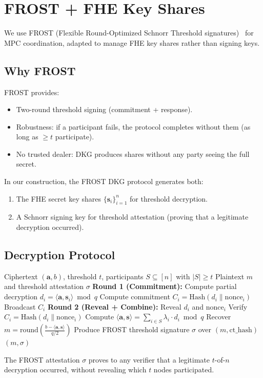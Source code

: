 \section{FROST + FHE Key Shares}


We use FROST (Flexible Round-Optimized Schnorr Threshold signatures)~\cite{frost2020} for MPC coordination, adapted to manage FHE key shares rather than signing keys.

\subsection{Why FROST}

FROST provides:
\begin{itemize}[leftmargin=2em]
\item Two-round threshold signing (commitment + response).
\item Robustness: if a participant fails, the protocol completes without them (as long as $\geq t$ participate).
\item No trusted dealer: DKG produces shares without any party seeing the full secret.
\end{itemize}

In our construction, the FROST DKG protocol generates both:
\begin{enumerate}[leftmargin=2em]
\item The FHE secret key shares $\{\mathbf{s}_i\}_{i=1}^n$ for threshold decryption.
\item A Schnorr signing key for threshold attestation (proving that a legitimate decryption occurred).
\end{enumerate}

\subsection{Decryption Protocol}

\begin{algorithm}[H]
\caption{Threshold FHE Decryption with FROST Attestation}
\begin{algorithmic}[1]
\Require Ciphertext $(\mathbf{a}, b)$, threshold $t$, participants $S \subseteq [n]$ with $|S| \geq t$
\Ensure Plaintext $m$ and threshold attestation $\sigma$
\State \textbf{Round 1 (Commitment):}
    \State Compute partial decryption $d_i = \langle \mathbf{a}, \mathbf{s}_i \rangle \bmod q$
    \State Compute commitment $C_i = \text{Hash}(d_i \| \text{nonce}_i)$
    \State Broadcast $C_i$
\EndFor
\State \textbf{Round 2 (Reveal + Combine):}
    \State Reveal $d_i$ and $\text{nonce}_i$
    \State Verify $C_i = \text{Hash}(d_i \| \text{nonce}_i)$
\EndFor
\State Compute $\langle \mathbf{a}, \mathbf{s} \rangle = \sum_{i \in S} \lambda_i \cdot d_i \bmod q$
\State Recover $m = \text{round}\left(\frac{b - \langle \mathbf{a}, \mathbf{s} \rangle}{q/2}\right)$
\State Produce FROST threshold signature $\sigma$ over $(m, \text{ct\_hash})$
\State \Return $(m, \sigma)$
\end{algorithmic}
\end{algorithm}

The FROST attestation $\sigma$ proves to any verifier that a legitimate $t$-of-$n$ decryption occurred, without revealing which $t$ nodes participated.

